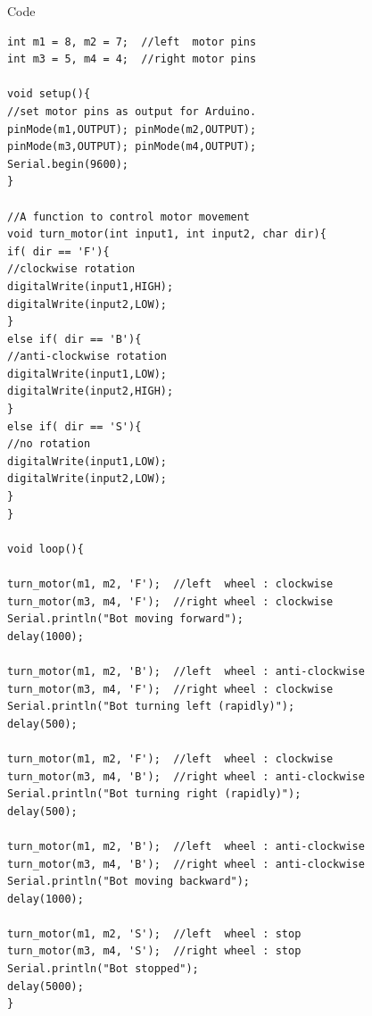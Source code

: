 Code\\
\begin{lstlisting}[style=CStyle]
int m1 = 8, m2 = 7;  //left  motor pins
int m3 = 5, m4 = 4;  //right motor pins

void setup(){
//set motor pins as output for Arduino.
pinMode(m1,OUTPUT); pinMode(m2,OUTPUT);
pinMode(m3,OUTPUT); pinMode(m4,OUTPUT);
Serial.begin(9600);
}

//A function to control motor movement
void turn_motor(int input1, int input2, char dir){
if( dir == 'F'){
//clockwise rotation
digitalWrite(input1,HIGH);
digitalWrite(input2,LOW);
}
else if( dir == 'B'){
//anti-clockwise rotation
digitalWrite(input1,LOW);
digitalWrite(input2,HIGH);
}
else if( dir == 'S'){
//no rotation
digitalWrite(input1,LOW);
digitalWrite(input2,LOW);
}
}

void loop(){

turn_motor(m1, m2, 'F');  //left  wheel : clockwise
turn_motor(m3, m4, 'F');  //right wheel : clockwise
Serial.println("Bot moving forward");
delay(1000);

turn_motor(m1, m2, 'B');  //left  wheel : anti-clockwise
turn_motor(m3, m4, 'F');  //right wheel : clockwise
Serial.println("Bot turning left (rapidly)");
delay(500);

turn_motor(m1, m2, 'F');  //left  wheel : clockwise
turn_motor(m3, m4, 'B');  //right wheel : anti-clockwise
Serial.println("Bot turning right (rapidly)");
delay(500);

turn_motor(m1, m2, 'B');  //left  wheel : anti-clockwise
turn_motor(m3, m4, 'B');  //right wheel : anti-clockwise
Serial.println("Bot moving backward");
delay(1000);

turn_motor(m1, m2, 'S');  //left  wheel : stop
turn_motor(m3, m4, 'S');  //right wheel : stop
Serial.println("Bot stopped");
delay(5000);
}

\end{lstlisting}

